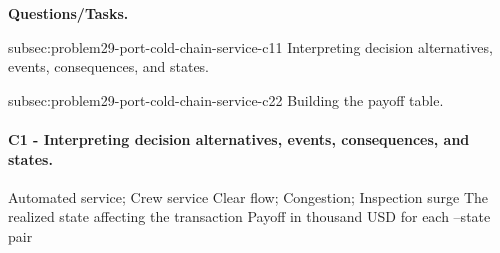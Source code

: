 	\textbf{Questions/Tasks.}
	\begin{enumerate}
	\CriterionTask
	{subsec:problem29-port-cold-chain-service-c1}{1}
	{Interpreting decision alternatives, events, consequences, and states.}

	\CriterionTask
	{subsec:problem29-port-cold-chain-service-c2}{2}
	{Building the payoff table.}
	\end{enumerate}

	\paragraph*{C1 - Interpreting decision alternatives, events, consequences, and states.}
	\label{subsec:problem29-port-cold-chain-service-c1}
	\DecisionElementsTable
	{Automated service; Crew service}
	{Clear flow; Congestion; Inspection surge}
	{The realized state affecting the transaction}
	{Payoff in thousand USD for each --state pair}


